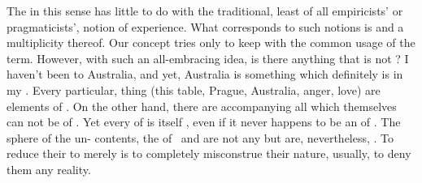 

\pa The  in this sense has little to do with the traditional,
least of all empiricists' or pragmaticists', notion of experience. What
corresponds to such notions is  and a multiplicity thereof.
Our concept tries only to keep with the common usage of the term.  However, with
such an all-embracing idea, is there anything that is not ? I
haven't been to Australia, and yet, Australia is something which definitely is
 in my . Every particular, 
thing (this table, Prague, Australia, anger, love) are elements of
. On the other hand, there are
 accompanying all  which themselves can not be
 of . Yet every  of 
is itself , even if it never happens to be an  of
. The sphere of the un- contents, the 
of \pexp\ and  are not any  but are,
nevertheless, . To reduce their  to merely
 is to completely misconstrue their nature, usually, to
deny them any reality.

